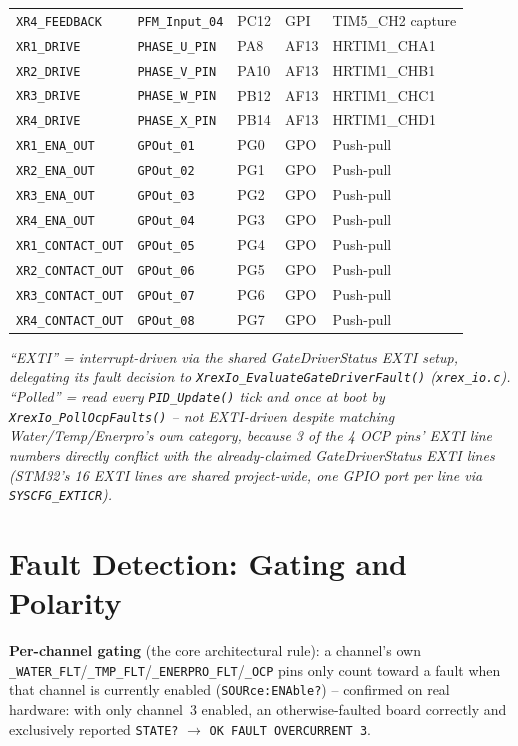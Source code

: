 \documentclass[11pt]{article}
\newcommand{\code}[1]{\texttt{#1}}
\begin{document}
{\begin{longtable}{p{1.3in} p{1.3in} p{0.4in} p{0.45in} p{1.15in}}
  \code{XR4\_FEEDBACK} & \code{PFM\_Input\_04} & PC12 & GPI & TIM5\_CH2 capture \\
  \code{XR1\_DRIVE} & \code{PHASE\_U\_PIN} & PA8 & AF13 & HRTIM1\_CHA1 \\
  \code{XR2\_DRIVE} & \code{PHASE\_V\_PIN} & PA10 & AF13 & HRTIM1\_CHB1 \\
  \code{XR3\_DRIVE} & \code{PHASE\_W\_PIN} & PB12 & AF13 & HRTIM1\_CHC1 \\
  \code{XR4\_DRIVE} & \code{PHASE\_X\_PIN} & PB14 & AF13 & HRTIM1\_CHD1 \\
  \code{XR1\_ENA\_OUT} & \code{GPOut\_01} & PG0 & GPO & Push-pull \\
  \code{XR2\_ENA\_OUT} & \code{GPOut\_02} & PG1 & GPO & Push-pull \\
  \code{XR3\_ENA\_OUT} & \code{GPOut\_03} & PG2 & GPO & Push-pull \\
  \code{XR4\_ENA\_OUT} & \code{GPOut\_04} & PG3 & GPO & Push-pull \\
  \code{XR1\_CONTACT\_OUT} & \code{GPOut\_05} & PG4 & GPO & Push-pull \\
  \code{XR2\_CONTACT\_OUT} & \code{GPOut\_06} & PG5 & GPO & Push-pull \\
  \code{XR3\_CONTACT\_OUT} & \code{GPOut\_07} & PG6 & GPO & Push-pull \\
  \code{XR4\_CONTACT\_OUT} & \code{GPOut\_08} & PG7 & GPO & Push-pull \\
  \hline
\end{longtable}
}

\noindent\textit{``EXTI'' = interrupt-driven via the shared
GateDriverStatus EXTI setup, delegating its fault decision to
\code{XrexIo\_EvaluateGateDriverFault()} (\code{xrex\_io.c}). ``Polled''
= read every \code{PID\_Update()} tick and once at boot by
\code{XrexIo\_PollOcpFaults()} -- not EXTI-driven despite matching
Water/Temp/Enerpro's own category, because 3 of the 4 OCP pins'
EXTI line numbers directly conflict with the already-claimed
GateDriverStatus EXTI lines (STM32's 16 EXTI lines are shared
project-wide, one GPIO port per line via \code{SYSCFG\_EXTICR}).}

\section{Fault Detection: Gating and Polarity}
\label{sec:polarity}

\textbf{Per-channel gating} (the core architectural rule): a channel's
own \code{\_WATER\_FLT}/\code{\_TMP\_FLT}/\code{\_ENERPRO\_FLT}/\code{\_OCP}
pins only count toward a fault when that channel is currently enabled
(\code{SOURce:ENAble?}) -- confirmed on real hardware: with only
channel~3 enabled, an otherwise-faulted board correctly and
exclusively reported \code{STATE?} $\to$ \code{OK FAULT OVERCURRENT 3}.
\end{document}
